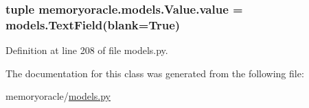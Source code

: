 \hypertarget{classmemoryoracle_1_1models_1_1Value_a7f23da89c776a06cd9c84754ac455295}{}
\subsubsection[{value}]{\setlength{\rightskip}{0pt plus 5cm}tuple memoryoracle.\+models.\+Value.\+value = models.\+Text\+Field(blank=True)\hspace{0.3cm}{\ttfamily [static]}}\label{classmemoryoracle_1_1models_1_1Value_a7f23da89c776a06cd9c84754ac455295}


Definition at line 208 of file models.\+py.



The documentation for this class was generated from the following file\+:\begin{DoxyCompactItemize}
\item 
memoryoracle/\hyperlink{models_8py}{models.\+py}\end{DoxyCompactItemize}

